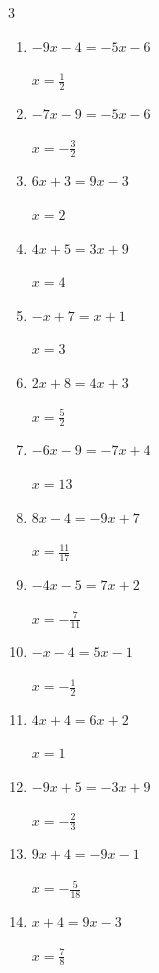 \begin{multicols}{3}
\begin{enumerate}
        $\displaystyle x=\frac{5}{6}$

  \item $-9x-4=-5x-6$

        $\displaystyle x=\frac{1}{2}$

  \item $-7x-9=-5x-6$

        $\displaystyle x=-\frac{3}{2}$

  \item $6x+3=9x-3$

        $\displaystyle x=2$

  \item $4x+5=3x+9$

        $\displaystyle x=4$

  \item $-x+7=x+1$

        $\displaystyle x=3$

  \item $2x+8=4x+3$

        $\displaystyle x=\frac{5}{2}$

  \item $-6x-9=-7x+4$

        $\displaystyle x=13$

  \item $8x-4=-9x+7$

        $\displaystyle x=\frac{11}{17}$

  \item $-4x-5=7x+2$

        $\displaystyle x=-\frac{7}{11}$

\columnbreak %

  \item $-x-4=5x-1$

        $\displaystyle x=-\frac{1}{2}$

  \item $4x+4=6x+2$

        $\displaystyle x=1$

  \item $-9x+5=-3x+9$

        $\displaystyle x=-\frac{2}{3}$

  \item $9x+4=-9x-1$

        $\displaystyle x=-\frac{5}{18}$

  \item $x+4=9x-3$

        $\displaystyle x=\frac{7}{8}$


\end{enumerate}
\end{multicols}
